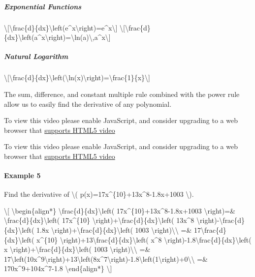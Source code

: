 \hypertarget{exponential-functions}{%
\subparagraph{Exponential Functions}\label{exponential-functions}}

\textbackslash{}{[}\textbackslash{}frac\{d\}\{dx\}\textbackslash{}left(e\^{}x\textbackslash{}right)=e\^{}x\textbackslash{}{]}
\textbackslash{}{[}\textbackslash{}frac\{d\}\{dx\}\textbackslash{}left(a\^{}x\textbackslash{}right)=\textbackslash{}ln(a)\textbackslash{},a\^{}x\textbackslash{}{]}

\hypertarget{natural-logarithm}{%
\subparagraph{Natural Logarithm}\label{natural-logarithm}}

\textbackslash{}{[}\textbackslash{}frac\{d\}\{dx\}\textbackslash{}left(\textbackslash{}ln(x)\textbackslash{}right)=\textbackslash{}frac\{1\}\{x\}\textbackslash{}{]}

The sum, difference, and constant multiple rule combined with the power
rule allow us to easily find the derivative of any polynomial.

To view this video please enable JavaScript, and consider upgrading to a
web browser that \href{http://videojs.com/html5-video-support/}{supports
HTML5 video}

To view this video please enable JavaScript, and consider upgrading to a
web browser that \href{http://videojs.com/html5-video-support/}{supports
HTML5 video}

\hypertarget{example-5}{%
\paragraph{Example 5}\label{example-5}}

Find the derivative of \textbackslash{}(
p(x)=17x\^{}\{10\}+13x\^{}8-1.8x+1003 \textbackslash{}).

\textbackslash{}{[} \textbackslash{}begin\{align*\}
\textbackslash{}frac\{d\}\{dx\}\textbackslash{}left(
17x\^{}\{10\}+13x\^{}8-1.8x+1003 \textbackslash{}right)=\&
\textbackslash{}frac\{d\}\{dx\}\textbackslash{}left( 17x\^{}\{10\}
\textbackslash{}right)+\textbackslash{}frac\{d\}\{dx\}\textbackslash{}left(
13x\^{}8
\textbackslash{}right)-\textbackslash{}frac\{d\}\{dx\}\textbackslash{}left(
1.8x
\textbackslash{}right)+\textbackslash{}frac\{d\}\{dx\}\textbackslash{}left(
1003 \textbackslash{}right)\textbackslash{}\textbackslash{} =\&
17\textbackslash{}frac\{d\}\{dx\}\textbackslash{}left( x\^{}\{10\}
\textbackslash{}right)+13\textbackslash{}frac\{d\}\{dx\}\textbackslash{}left(
x\^{}8
\textbackslash{}right)-1.8\textbackslash{}frac\{d\}\{dx\}\textbackslash{}left(
x
\textbackslash{}right)+\textbackslash{}frac\{d\}\{dx\}\textbackslash{}left(
1003 \textbackslash{}right)\textbackslash{}\textbackslash{} =\&
17\textbackslash{}left(10x\^{}9\textbackslash{}right)+13\textbackslash{}left(8x\^{}7\textbackslash{}right)-1.8\textbackslash{}left(1\textbackslash{}right)+0\textbackslash{}\textbackslash{}
=\& 170x\^{}9+104x\^{}7-1.8 \textbackslash{}end\{align*\}
\textbackslash{}{]}

